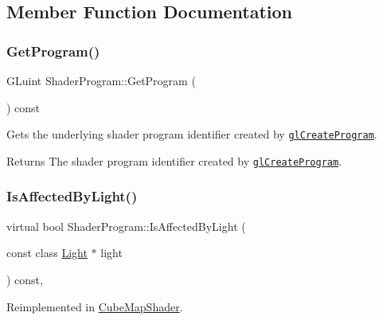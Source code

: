 \subsection{Member Function Documentation}
\hypertarget{class_shader_program_a7313b3596bcd6d982d9624a46cc2acc6}{}\label{class_shader_program_a7313b3596bcd6d982d9624a46cc2acc6} 
\subsubsection{\texorpdfstring{Get\+Program()}{GetProgram()}}
{\footnotesize\ttfamily G\+Luint Shader\+Program\+::\+Get\+Program (\begin{DoxyParamCaption}{ }\end{DoxyParamCaption}) const\hspace{0.3cm}{\ttfamily [inline]}}



Gets the underlying shader program identifier created by \href{https://www.opengl.org/sdk/docs/man/html/glCreateProgram.xhtml}{\tt gl\+Create\+Program}. 

\begin{DoxyReturn}{Returns}
The shader program identifier created by \href{https://www.opengl.org/sdk/docs/man/html/glCreateProgram.xhtml}{\tt gl\+Create\+Program}. 
\end{DoxyReturn}
\hypertarget{class_shader_program_a20b5ed7b5f81154025eb7b6f1be70f84}{}\label{class_shader_program_a20b5ed7b5f81154025eb7b6f1be70f84} 
\subsubsection{\texorpdfstring{Is\+Affected\+By\+Light()}{IsAffectedByLight()}}
{\footnotesize\ttfamily virtual bool Shader\+Program\+::\+Is\+Affected\+By\+Light (\begin{DoxyParamCaption}\item[{const class \hyperlink{class_light}{Light} $\ast$}]{light }\end{DoxyParamCaption}) const\hspace{0.3cm}{\ttfamily [inline]}, {\ttfamily [virtual]}}



Reimplemented in \hyperlink{class_cube_map_shader_aa0c9e535cb18663acd9857165abc788f}{Cube\+Map\+Shader}.

